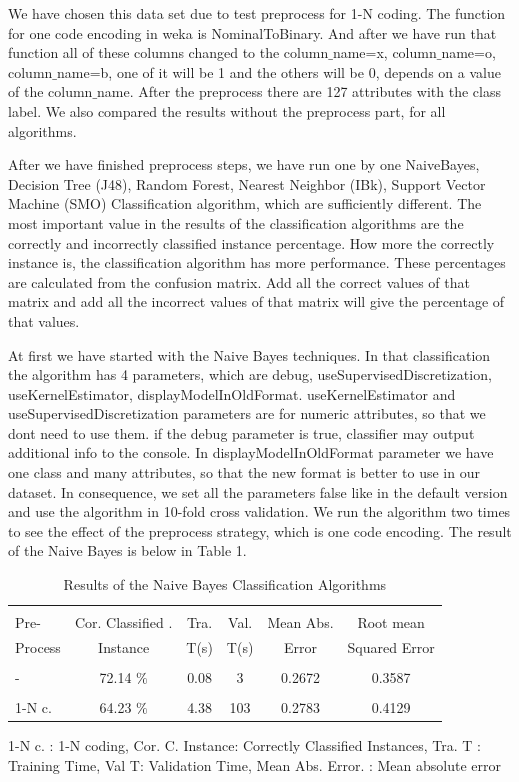 \documentclass[a4paper]{article}
\begin{document}
We have chosen this data set due to test preprocess for 1-N coding. The
function for one code encoding in weka is NominalToBinary. And after we have
run that function all of these columns changed to the column$\_$name=x,
column$\_$name=o, column$\_$name=b, one of it will be 1 and the others will be
0, depends on a value of the column$\_$name. After the preprocess there are 127
attributes with the class label. We also compared the results without the
preprocess part, for all algorithms.

After we have finished preprocess steps, we have run one by one NaiveBayes,
Decision Tree (J48), Random Forest, Nearest Neighbor (IBk), Support Vector
Machine (SMO) Classification algorithm, which are sufficiently different. The
most important value in the results of the classification algorithms are the
correctly and incorrectly classified instance percentage. How more the
correctly instance is, the classification algorithm has more performance. These
percentages are calculated from the confusion matrix. Add all the correct
values of that matrix and add all the incorrect values of that matrix will give
the percentage of that values. 

At first we have started with the Naive Bayes techniques. In that
classification the algorithm has 4 parameters, which are debug,
useSupervisedDiscretization, useKernelEstimator, displayModelInOldFormat.
useKernelEstimator and useSupervisedDiscretization parameters are for numeric
attributes, so that we dont need to use them. if the debug parameter is true,
classifier may output additional info to the console. In
displayModelInOldFormat parameter we have one class and many attributes, so
that the new format is better to use in our dataset. In consequence, we set all
the parameters false like in the default version and use the algorithm in
10-fold cross validation. We run the algorithm two times to see the effect of
the preprocess strategy, which is one code encoding. The result of the Naive
Bayes is below in Table 1.

\begin{table}
\begin{tabular}{|l| c | c | c |c |c |}

\hline & & & & & \\
Pre- & Cor. Classified . & Tra. & Val. & Mean Abs.  & Root mean \\
Process & Instance & T(s) &  T(s) & Error & Squared Error \\
\hline & & & & & \\
- &72.14  $\%$ & 0.08 & 3 &  0.2672 & 0.3587 \\ 
\hline & & & & & \\
1-N c. &64.23  $\%$ & 4.38 & 103 & 0.2783 & 0.4129 \\ 
\hline
\end{tabular}
\caption{Results of the Naive Bayes Classification Algorithms}
	1-N c. : 1-N coding,
	Cor. C. Instance:  Correctly Classified Instances,
	Tra. T : Training Time,
	Val T: Validation Time,
	Mean Abs. Error. : Mean absolute error 
\end{table}
\end{document}
